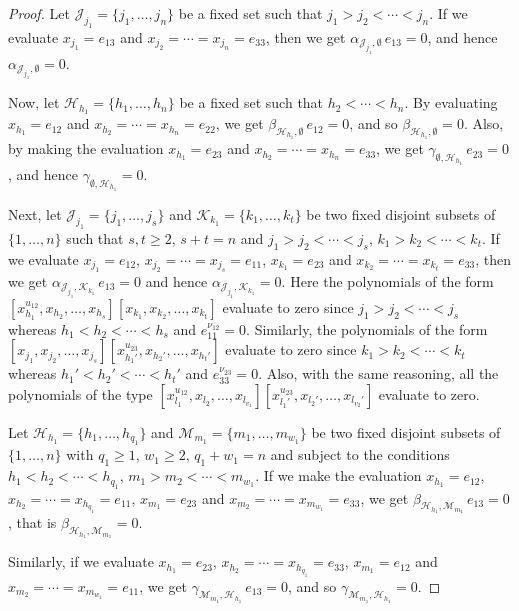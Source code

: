 \documentclass[10pt,a4paper]{amsart}
\begin{document}
\begin{proof}
Let $\mathcal J_{j_1}=\{j_1,\ldots,j_n\}$ be a fixed set such that $j_1>j_2<\cdots<j_n$. If we
evaluate $x_{j_1}=e_{13}$ and $x_{j_2}=\cdots=x_{j_n}=e_{33}$, then we get
$\alpha_{\mathcal J_{j_1},\emptyset}\,e_{13}=0$, and hence $\alpha_{\mathcal J_{j_1},\emptyset}=0$.

Now, let $\mathcal H_{h_1}=\{h_1,\ldots,h_n\}$ be a fixed set such that $h_2<\cdots<h_n$. By
evaluating $x_{h_1}=e_{12}$ and $x_{h_2}=\cdots=x_{h_n}=e_{22}$, we get
$\beta_{\mathcal H_{h_1},\emptyset}\,e_{12}=0$, and so $\beta_{\mathcal H_{h_1},\emptyset}=0$.
Also, by making the evaluation $x_{h_1}=e_{23}$ and $x_{h_2}=\cdots=x_{h_n}=e_{33}$, we get
$\gamma_{\emptyset,\mathcal H_{h_1}}\,e_{23}=0$, and hence $\gamma_{\emptyset,\mathcal H_{h_1}}=0$.

Next, let $\mathcal J_{j_1}=\{j_1,\ldots,j_s\}$ and $\mathcal K_{k_1}=\{k_1,\ldots,k_t\}$ be two
fixed disjoint subsets of $\{1,\ldots,n\}$ such that $s,t\ge2$, $s+t=n$ and
$j_1>j_2<\cdots<j_s$, $k_1>k_2<\cdots<k_t$. If we evaluate $x_{j_1}=e_{12}$,
$x_{j_2}=\cdots=x_{j_s}=e_{11}$, $x_{k_1}=e_{23}$ and $x_{k_2}=\cdots=x_{k_t}=e_{33}$, then we get
$\alpha_{\mathcal J_{j_1},\mathcal K_{k_1}}\,e_{13}=0$ and hence $\alpha_{\mathcal J_{j_1},
\mathcal K_{k_1}}=0$. Here the polynomials of the form
$[x_{h_1}^{u_{12}},x_{h_2},\ldots,x_{h_s}][x_{k_1},x_{k_2},\ldots,x_{k_t}]$ evaluate to zero since
$j_1>j_2<\cdots<j_s$ whereas $h_1<h_2<\cdots<h_s$ and $e_{11}^{\nu_{12}}=0$. Similarly, the
polynomials of the form
$[x_{j_1},x_{j_2},\ldots,x_{j_s}][x_{h_1'}^{u_{23}},x_{h_2'},\ldots,x_{h_t'}]$ evaluate to zero
since $k_1>k_2<\cdots<k_t$ whereas $h_1'<h_2'<\cdots<h_t'$ and $e_{33}^{\nu_{23}}=0$. Also, with
the same reasoning, all the polynomials of the type
$[x_{l_1}^{u_{12}},x_{l_2},\ldots,x_{l_{v_1}}][x_{l_1'}^{u_{23}},x_{l_2'},\ldots,x_{l_{v_2}'}]$
evaluate to zero.

Let $\mathcal H_{h_1}=\{h_1,\ldots,h_{q_1}\}$ and $\mathcal M_{m_1}=\{m_1,\ldots,m_{w_1}\}$ be two
fixed disjoint subsets of $\{1,\ldots,n\}$ with $q_1\ge1$, $w_1\ge2$, $q_1+w_1=n$ and subject to
the conditions $h_1<h_2<\cdots<h_{q_1}$, $m_1>m_2<\cdots<m_{w_1}$. If we make the evaluation
$x_{h_1}=e_{12}$, $x_{h_2}=\cdots=x_{h_{q_1}}=e_{11}$, $x_{m_1}=e_{23}$ and
$x_{m_2}=\cdots=x_{m_{w_1}}=e_{33}$, we get $\beta_{\mathcal H_{h_1},\mathcal M_{m_1}}\,e_{13}=0$,
that is $\beta_{\mathcal H_{h_1},\mathcal M_{m_1}}=0$.

Similarly, if we evaluate $x_{h_1}=e_{23}$, $x_{h_2}=\cdots=x_{h_{q_1}}=e_{33}$, $x_{m_1}=e_{12}$
and $x_{m_2}=\cdots=x_{m_{w_1}}=e_{11}$, we get $\gamma_{\mathcal M_{m_1},\mathcal
H_{h_1}}\,e_{13}=0$, and so $\gamma_{\mathcal M_{m_1},\mathcal H_{h_1}}=0$.


\end{proof}
\end{document}
